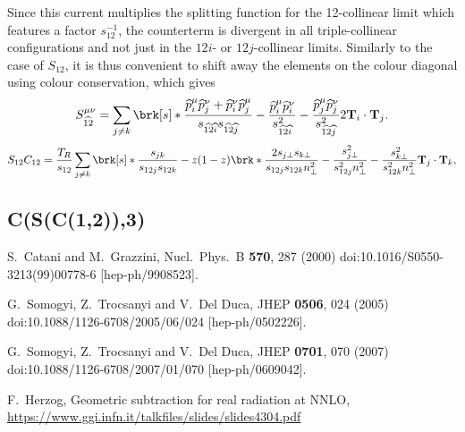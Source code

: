 \documentclass[11pt,a4paper]{article}
\newcommand{\colorT}[1]{\mathbf{T}_{#1}}
\newcommand{\mgd}[1]{\widehat{#1}}
\begin{document}
Since this current multiplies the splitting function for the 12-collinear limit
which features a factor $s_{12}^{-1}$,
the counterterm is divergent in all triple-collinear configurations
and not just in the $12i$- or $12j$-collinear limits.
Similarly to the case of $S_{12}$, it is thus convenient
to shift away the elements on the colour diagonal using colour conservation,
which gives
\begin{equation}
	S_{\mgd{12}}^{\mu\nu}
	= \sum_{j \ne k} \brk[s]*{
		\frac{\mgd{p}_i^\mu \mgd{p}_j^\nu + \mgd{p}_i^\nu \mgd{p}_j^\mu}
		{s_{\mgd{12}\mgd{i}} s_{\mgd{12}\mgd{j}}}
		- \frac{\mgd{p}_i^\mu \mgd{p}_i^\nu}{s_{\mgd{12}\mgd{i}}^2}
		- \frac{\mgd{p}_j^\mu \mgd{p}_j^\nu}{s_{\mgd{12}\mgd{j}}^2}
	} 2 \colorT{i}\cdot\colorT{j}.
\end{equation}
\begin{equation}
	S_{12} C_{12} = \frac{T_R}{s_{12}} \sum_{j \ne k} \brk[s]*{
		\frac{s_{jk}}{s_{12j}s_{12k}}
		-z(1-z)\brk*{
		\frac{2 s_{j\perp} s_{k\perp}}{s_{12j} s_{12k} n_\perp^2}
		- \frac{s_{j\perp}^2}{s_{12j}^2 n_\perp^2}
		- \frac{s_{k\perp}^2}{s_{12k}^2 n_\perp^2}
		}
	} \colorT{j}\cdot\colorT{k},
\end{equation}


\subsection{C(S(C(1,2)),3)}


\begin{thebibliography}{9}

  S.~Catani and M.~Grazzini,
  Nucl.\ Phys.\ B {\bf 570}, 287 (2000)
  doi:10.1016/S0550-3213(99)00778-6
  [hep-ph/9908523].

  G.~Somogyi, Z.~Trocsanyi and V.~Del Duca,
  JHEP {\bf 0506}, 024 (2005)
  doi:10.1088/1126-6708/2005/06/024
  [hep-ph/0502226].

  G.~Somogyi, Z.~Trocsanyi and V.~Del Duca,
  JHEP {\bf 0701}, 070 (2007)
  doi:10.1088/1126-6708/2007/01/070
  [hep-ph/0609042].
  
	F.~Herzog,
	Geometric subtraction for real radiation at NNLO,
	\url{https://www.ggi.infn.it/talkfiles/slides/slides4304.pdf}
 
\end{thebibliography}
\end{document}
